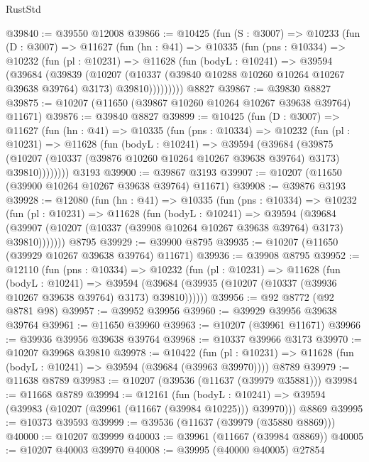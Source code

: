 \begin{lexlean}{RustStd}
\begin{coremodule}
@39840 := @39550 @12008
@39866 := @10425
    (fun (S : @3007) =>
    @10233
      (fun (D : @3007) =>
      @11627
        (fun (hn : @41) =>
        @10335
          (fun (pns : @10334) =>
          @10232
            (fun (pl : @10231) =>
            @11628
              (fun (bodyL : @10241) =>
              @39594
                (@39684
                  (@39839
                    (@10207
                      (@10337 (@39840 @10288 @10260 @10264 @10267 @39638 @39764) @3173)
                      @39810)))))))))
    @8827
@39867 := @39830 @8827
@39875 := @10207 (@11650 (@39867 @10260 @10264 @10267 @39638 @39764) @11671)
@39876 := @39840 @8827
@39899 := @10425
    (fun (D : @3007) =>
    @11627
      (fun (hn : @41) =>
      @10335
        (fun (pns : @10334) =>
        @10232
          (fun (pl : @10231) =>
          @11628
            (fun (bodyL : @10241) =>
            @39594
              (@39684
                (@39875
                  (@10207 (@10337 (@39876 @10260 @10264 @10267 @39638 @39764) @3173) @39810))))))))
    @3193
@39900 := @39867 @3193
@39907 := @10207 (@11650 (@39900 @10264 @10267 @39638 @39764) @11671)
@39908 := @39876 @3193
@39928 := @12080
    (fun (hn : @41) =>
    @10335
      (fun (pns : @10334) =>
      @10232
        (fun (pl : @10231) =>
        @11628
          (fun (bodyL : @10241) =>
          @39594
            (@39684
              (@39907 (@10207 (@10337 (@39908 @10264 @10267 @39638 @39764) @3173) @39810)))))))
    @8795
@39929 := @39900 @8795
@39935 := @10207 (@11650 (@39929 @10267 @39638 @39764) @11671)
@39936 := @39908 @8795
@39952 := @12110
    (fun (pns : @10334) =>
    @10232
      (fun (pl : @10231) =>
      @11628
        (fun (bodyL : @10241) =>
        @39594 (@39684 (@39935 (@10207 (@10337 (@39936 @10267 @39638 @39764) @3173) @39810))))))
@39956 := @92 @8772 (@92 @8781 @98)
@39957 := @39952 @39956
@39960 := @39929 @39956 @39638 @39764
@39961 := @11650 @39960
@39963 := @10207 (@39961 @11671)
@39966 := @39936 @39956 @39638 @39764
@39968 := @10337 @39966 @3173
@39970 := @10207 @39968 @39810
@39978 := @10422
    (fun (pl : @10231) => @11628 (fun (bodyL : @10241) => @39594 (@39684 (@39963 @39970))))
    @8789
@39979 := @11638 @8789
@39983 := @10207 (@39536 (@11637 (@39979 @35881)))
@39984 := @11668 @8789
@39994 := @12161
    (fun (bodyL : @10241) => @39594 (@39983 (@10207 (@39961 (@11667 (@39984 @10225))) @39970)))
    @8869
@39995 := @10373 @39593
@39999 := @39536 (@11637 (@39979 (@35880 @8869)))
@40000 := @10207 @39999
@40003 := @39961 (@11667 (@39984 @8869))
@40005 := @10207 @40003 @39970
@40008 := @39995 (@40000 @40005) @27854

\end{coremodule}
\end{lexlean}
